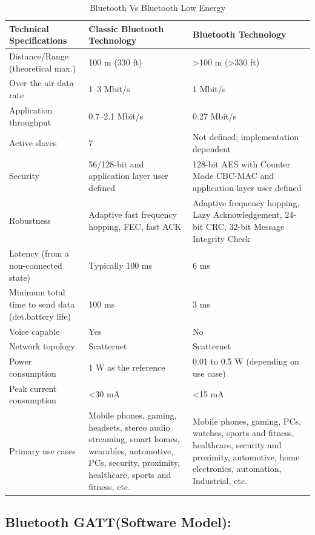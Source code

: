 \documentclass[12pt,a4paper]{report}
\begin{document}
\begin{table}
	\caption{Bluetooth Vs Bluetooth Low Energy}
	\center
	\begin{tabular}{|p{4cm}|p{4cm}|p{4cm}|}
		\hline
		\textbf{Technical Specifications }& \textbf{Classic Bluetooth Technology} & \textbf{ Bluetooth Technology}\\
		\hline
		Distance/Range (theoretical max.) & 100 m (330 ft) & >100 m (>330 ft)\\
		\hline
		Over the air data rate & 1–3 Mbit/s	& 1 Mbit/s\\
		\hline
		Application throughput	& 0.7–2.1 Mbit/s & 0.27 Mbit/s\\
		\hline
		Active slaves	& 7	& Not defined; implementation dependent\\
		\hline
		Security	& 56/128-bit and application layer user defined & 128-bit AES with Counter Mode CBC-MAC and application layer user defined\\
		\hline
		Robustness	& Adaptive fast frequency hopping, FEC, fast ACK
		& Adaptive frequency hopping, Lazy Acknowledgement, 24-bit CRC, 32-bit Message Integrity Check\\
		\hline
		Latency (from a non-connected state) &	Typically 100 ms	& 6 ms\\
		\hline
		Minimum total time to send data (det.battery life)	& 100 ms &	3 ms \\
		\hline
		Voice capable &	Yes &	No\\
		\hline
		Network topology &	Scatternet & Scatternet\\
		\hline
		Power consumption	& 1 W as the reference	& 0.01 to 0.5 W (depending on use case)\\
		\hline
		Peak current consumption &	<30 mA &	<15 mA\\
		\hline
		Primary use cases &	Mobile phones, gaming, headsets, stereo audio streaming, smart homes, wearables, automotive, PCs, security, proximity, healthcare, sports and fitness, etc.	& Mobile phones, gaming, PCs, watches, sports and fitness, healthcare, security and proximity, automotive, home electronics, automation, Industrial, etc.\\
		\hline
	\end{tabular}
\end{table}

\newpage
\subsection{Bluetooth GATT(Software Model):}
\end{document}
